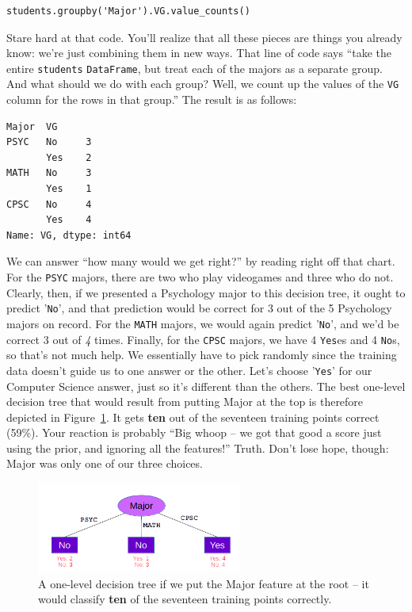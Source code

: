 \begin{Verbatim}[fontsize=\small,samepage=true,frame=single,framesep=3mm]
students.groupby('Major').VG.value_counts()
\end{Verbatim}

Stare hard at that code. You'll realize that all these pieces are things you
already know: we're just combining them in new ways. That line of code says
``take the entire \texttt{students} \texttt{DataFrame}, but treat each of the
majors as a separate group. And what should we do with each group? Well, we
count up the values of the \texttt{VG} column for the rows in that group.'' The
result is as follows:

\begin{Verbatim}[fontsize=\small,samepage=true,frame=leftline,framesep=5mm,framerule=1mm]
Major  VG 
PSYC   No     3
       Yes    2
MATH   No     3
       Yes    1
CPSC   No     4
       Yes    4
Name: VG, dtype: int64
\end{Verbatim}

We can answer ``how many would we get right?'' by reading right off that chart.
For the \texttt{PSYC} majors, there are two who play videogames and three who
do not. Clearly, then, if we presented a Psychology major to this decision
tree, it ought to predict '\texttt{No}', and that prediction would be correct
for 3 out of the 5 Psychology majors on record. For the \texttt{MATH} majors,
we would again predict '\texttt{No}', and we'd be correct 3 out of \textit{4}
times. Finally, for the \texttt{CPSC} majors, we have 4 \texttt{Yes}es and 4
\texttt{No}s, so that's not much help. We essentially have to pick randomly
since the training data doesn't guide us to one answer or the other. Let's
choose '\texttt{Yes}' for our Computer Science answer, just so it's different
than the others. The best one-level decision tree that would result from
putting \textsf{Major} at the top is therefore depicted in
Figure~\ref{fig:majorOnTop}. It gets \textbf{ten} out of the seventeen training
points correct (59\%). Your reaction is probably ``Big whoop -- we got that
good a score just using the prior, and ignoring all the features!'' Truth.
Don't lose hope, though: \textsf{Major} was only one of our three choices.

\begin{figure}[ht]
\centering
\includegraphics[width=0.6\textwidth]{majorOnTop.png}
\caption{A one-level decision tree if we put the \textsf{Major} feature at the
root -- it would classify \textbf{ten} of the seventeen training points
correctly.}
\label{fig:majorOnTop}
\end{figure}

